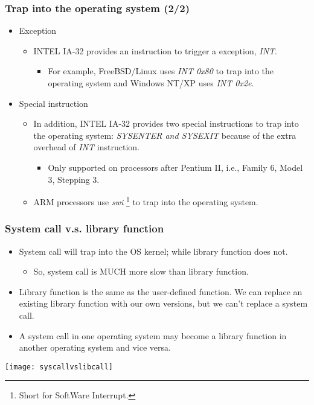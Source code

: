 \documentclass[CJKutf8,dvipsnames,table]{beamer}
\begin{document}
\begin{CJK*}{UTF8}{song}
  \begin{frame}
    \frametitle{Trap into the operating system (2/2)} \pause
    \begin{itemize}
    \item{Exception} \pause
      \begin{itemize}
      \item{INTEL IA-32 provides an instruction to trigger a exception, \emph{INT}.} \pause
        \begin{itemize}
        \item{For example, FreeBSD/Linux uses \emph{INT 0x80} to trap into the operating system and Windows NT/XP uses \emph{INT 0x2e}.} \pause
        \end{itemize}
      \end{itemize}
    \item{Special instruction} \pause
      \begin{itemize}
      \item{In addition, INTEL IA-32 provides two special instructions to trap into the operating system: \emph{SYSENTER and SYSEXIT} because of the extra overhead of \emph{INT} instruction.} \pause
        \begin{itemize}
        \item{Only supported on processors after Pentium II, i.e., Family 6, Model 3, Stepping 3.} \pause
        \end{itemize}
      \item{ARM processors use \emph{swi} \footnote{Short for SoftWare
        Interrupt.} to trap into the operating system.}
      \end{itemize}
    \end{itemize}
  \end{frame}

  \begin{frame}
    \frametitle{System call v.s. library function} \pause
    \begin{itemize}
    \item{System call will trap into the OS kernel; while library function does not.} \pause
      \begin{itemize}
      \item{So, system call is MUCH more slow than library function.} \pause
      \end{itemize}
    \item{Library function is the same as the user-defined function. We can replace an existing library function with our own versions, but we can't replace a system call.} \pause
    \item{A system call in one operating system may become a library function in another operating system and vice versa.} \pause
    \end{itemize}
    \begin{center}
      \texttt{[image: syscallvslibcall]}
    \end{center}
  \end{frame}


\end{CJK*}
\end{document}
